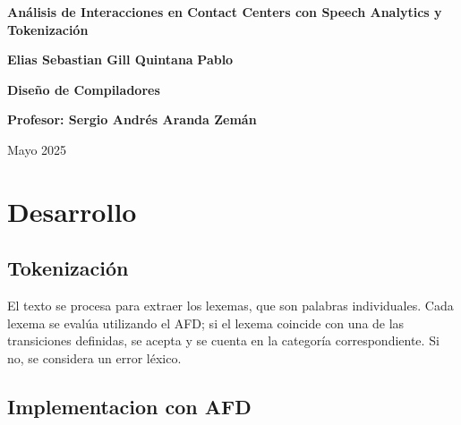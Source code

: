 \documentclass[12pt,a4paper]{article}
\begin{document}

\begin{titlepage}
	\begin{center}

		\vspace*{1cm}
		\textbf{\LARGE{Análisis de Interacciones en Contact Centers con
				Speech Analytics y Tokenización}}

		\vspace{2cm}
		\textbf{\large{Elias Sebastian Gill Quintana}}
		\textbf{\large{Pablo}}
		\vfill

		\textbf{\large{Diseño de Compiladores}}
		\vspace{0.5cm}

		\textbf{\large{Profesor: Sergio Andrés Aranda Zemán}}
		\vspace{1.5cm}

		Mayo 2025
		\vfill

	\end{center}
\end{titlepage}
\vspace{7mm}


\tableofcontents
\newpage



\newpage

\section{Desarrollo}

\subsection{Tokenización}
El texto se procesa para extraer los lexemas, que son palabras individuales. Cada lexema se
evalúa utilizando el AFD; si el lexema coincide con una de las transiciones definidas, se
acepta y se cuenta en la categoría correspondiente. Si no, se considera un error léxico.

\subsection{Implementacion con AFD}

\end{document}
